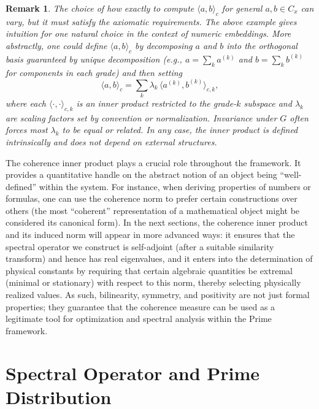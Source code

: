 \documentclass[11pt]{article}
\newtheorem*{remark}{Remark}
\begin{document}
\begin{remark}
The choice of how exactly to compute $\langle a, b\rangle_c$ for general $a,b\in C_x$ can vary, but it must satisfy the axiomatic requirements. The above example gives intuition for one natural choice in the context of numeric embeddings. More abstractly, one could define $\langle a, b\rangle_c$ by decomposing $a$ and $b$ into the orthogonal basis guaranteed by unique decomposition (e.g., $a = \sum_k a^{(k)}$ and $b = \sum_k b^{(k)}$ for components in each grade) and then setting 
\[ 
\langle a, b\rangle_c = \sum_k \lambda_k\, \langle a^{(k)}, b^{(k)}\rangle_{c,k},
\] 
where each $\langle \cdot,\cdot\rangle_{c,k}$ is an inner product restricted to the grade-$k$ subspace and $\lambda_k$ are scaling factors set by convention or normalization. Invariance under $G$ often forces most $\lambda_k$ to be equal or related. In any case, the inner product is defined intrinsically and does not depend on external structures.
\end{remark}

The coherence inner product plays a crucial role throughout the framework. It provides a quantitative handle on the abstract notion of an object being ``well-defined'' within the system. For instance, when deriving properties of numbers or formulas, one can use the coherence norm to prefer certain constructions over others (the most ``coherent'' representation of a mathematical object might be considered its canonical form). In the next sections, the coherence inner product and its induced norm will appear in more advanced ways: it ensures that the spectral operator we construct is self-adjoint (after a suitable similarity transform) and hence has real eigenvalues, and it enters into the determination of physical constants by requiring that certain algebraic quantities be extremal (minimal or stationary) with respect to this norm, thereby selecting physically realized values. As such, bilinearity, symmetry, and positivity are not just formal properties; they guarantee that the coherence measure can be used as a legitimate tool for optimization and spectral analysis within the Prime framework.

\section{Spectral Operator and Prime Distribution}
\end{document}
